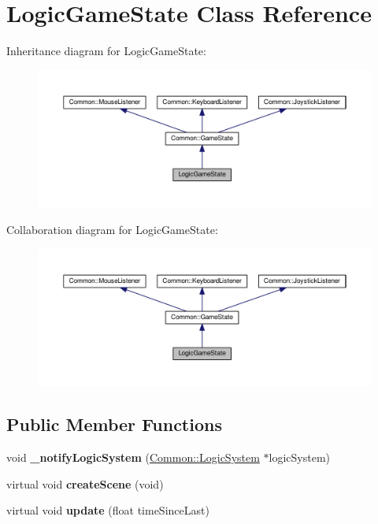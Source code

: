 \hypertarget{class_logic_game_state}{}\section{Logic\+Game\+State Class Reference}
\label{class_logic_game_state}


Inheritance diagram for Logic\+Game\+State\+:\nopagebreak
\begin{figure}[H]
\begin{center}
\leavevmode
\includegraphics[width=350pt]{class_logic_game_state__inherit__graph}
\end{center}
\end{figure}


Collaboration diagram for Logic\+Game\+State\+:\nopagebreak
\begin{figure}[H]
\begin{center}
\leavevmode
\includegraphics[width=350pt]{class_logic_game_state__coll__graph}
\end{center}
\end{figure}
\subsection*{Public Member Functions}
\begin{DoxyCompactItemize}
\item 
\mbox{\label{class_logic_game_state_a769594b36e5668497b9ef0b37dcb4b9b}} 
void {\bfseries \+\_\+notify\+Logic\+System} (\hyperlink{class_common_1_1_logic_system}{Common\+::\+Logic\+System} $\ast$logic\+System)
\item 
\mbox{\label{class_logic_game_state_a8ac73ebad7575ebdb5e36fdd59799332}} 
virtual void {\bfseries create\+Scene} (void)
\item 
\mbox{\label{class_logic_game_state_a144a2deb659d903956bd955d86c4d6b7}} 
virtual void {\bfseries update} (float time\+Since\+Last)
\end{DoxyCompactItemize}


